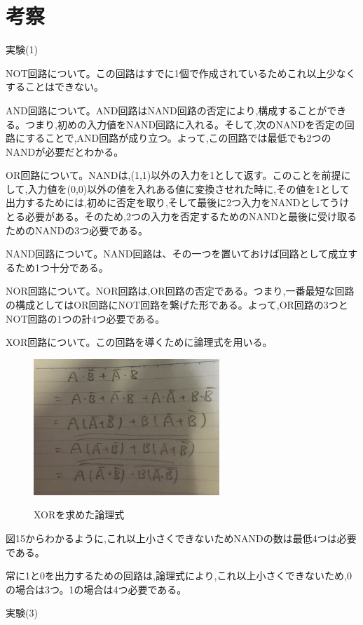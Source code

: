\documentclass[a4paper,11pt,titlepage]{jarticle}
\begin{document}
\section{考察}\par
実験(1)\par
NOT回路について。この回路はすでに1個で作成されているためこれ以上少なくすることはできない。\par
AND回路について。AND回路はNAND回路の否定により,構成することができる。つまり,初めの入力値をNAND回路に入れる。そして,次のNANDを否定の回路にすることで,AND回路が成り立つ。よって,この回路では最低でも2つのNANDが必要だとわかる。\par
OR回路について。NANDは,(1,1)以外の入力を1として返す。このことを前提にして,入力値を(0,0)以外の値を入れある値に変換させれた時に,その値を1として出力するためには,初めに否定を取り,そして最後に2つ入力をNANDとしてうけとる必要がある。そのため,2つの入力を否定するためのNANDと最後に受け取るためのNANDの3つ必要である。\par
NAND回路について。NAND回路は、その一つを置いておけば回路として成立するため1つ十分である。\par
NOR回路について。NOR回路は,OR回路の否定である。つまり,一番最短な回路の構成としてはOR回路にNOT回路を繋げた形である。よって,OR回路の3つとNOT回路の1つの計4つ必要である。\par
XOR回路について。この回路を導くために論理式を用いる。\par
\begin{figure}[htbp]
  \centering
  \includegraphics[width=70mm]{sample18.png}
  \label{sample15}\\
  \caption{XORを求めた論理式}
\end{figure}
\par
図15からわかるように,これ以上小さくできないためNANDの数は最低4つは必要である。\par
常に1と0を出力するための回路は,論理式により,これ以上小さくできないため,0の場合は3つ。1の場合は4つ必要である。\par
実験(3)\par
\end{document}
